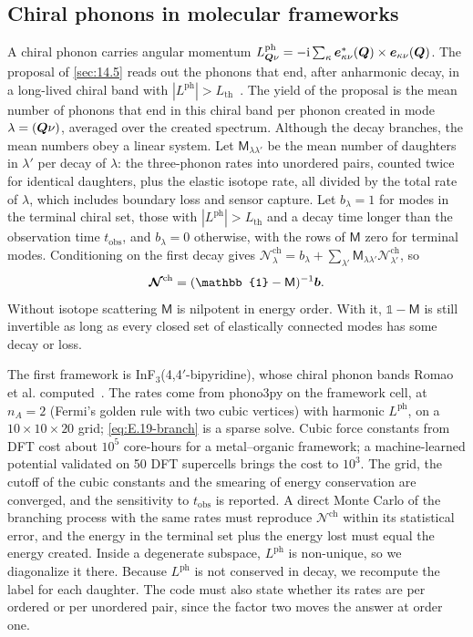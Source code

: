 \subsection{Chiral phonons in molecular frameworks}

A chiral phonon carries angular momentum $L^{\mathrm{ph}}_{\bm{Q}\nu} = -\mathrm{i}\sum_\kappa\bm{e}^*_{\kappa\nu}(\bm{Q})\times\bm{e}_{\kappa\nu}(\bm{Q})$. The proposal of \cref{sec:14.5} reads out the phonons that end, after anharmonic decay, in a long-lived chiral band with $|L^{\mathrm{ph}}| > L_{\mathrm{th}}$~\cite{romao2023chiral}. The yield of the proposal is the mean number of phonons that end in this chiral band per phonon created in mode $\lambda = (\bm{Q}\nu)$, averaged over the created spectrum. Although the decay branches, the mean numbers obey a linear system. Let $\mathsf{M}_{\lambda\lambda'}$ be the mean number of daughters in $\lambda'$ per decay of $\lambda$: the three-phonon rates into unordered pairs, counted twice for identical daughters, plus the elastic isotope rate, all divided by the total rate of $\lambda$, which includes boundary loss and sensor capture. Let $b_\lambda = 1$ for modes in the terminal chiral set, those with $|L^{\mathrm{ph}}| > L_{\mathrm{th}}$ and a decay time longer than the observation time $t_{\mathrm{obs}}$, and $b_\lambda = 0$ otherwise, with the rows of $\mathsf{M}$ zero for terminal modes. Conditioning on the first decay gives $\mathcal{N}^{\mathrm{ch}}_\lambda = b_\lambda + \sum_{\lambda'}\mathsf{M}_{\lambda\lambda'}\mathcal{N}^{\mathrm{ch}}_{\lambda'}$, so
\begin{equation}
  \boldsymbol{\mathcal{N}}^{\mathrm{ch}} = (\mathbb{1} - \mathsf{M})^{-1}\vect{b} .
  \label{eq:E.19-branch}
\end{equation}
Without isotope scattering $\mathsf{M}$ is nilpotent in energy order. With it, $\mathbb{1} - \mathsf{M}$ is still invertible as long as every closed set of elastically connected modes has some decay or loss.

The first framework is InF$_3$(4,4$'$-bipyridine), whose chiral phonon bands Romao et al. computed~\cite{romao2023chiral}. The rates come from phono3py on the framework cell, at $n_A = 2$ (Fermi's golden rule with two cubic vertices) with harmonic $L^{\mathrm{ph}}$, on a $10\times10\times20$ grid; \cref{eq:E.19-branch} is a sparse solve. Cubic force constants from DFT cost about $10^5$ core-hours for a metal--organic framework; a machine-learned potential validated on 50 DFT supercells brings the cost to $10^3$. The grid, the cutoff of the cubic constants and the smearing of energy conservation are converged, and the sensitivity to $t_{\mathrm{obs}}$ is reported. A direct Monte Carlo of the branching process with the same rates must reproduce $\boldsymbol{\mathcal{N}}^{\mathrm{ch}}$ within its statistical error, and the energy in the terminal set plus the energy lost must equal the energy created. Inside a degenerate subspace, $L^{\mathrm{ph}}$ is non-unique, so we diagonalize it there. Because $L^{\mathrm{ph}}$ is not conserved in decay, we recompute the label for each daughter. The code must also state whether its rates are per ordered or per unordered pair, since the factor two moves the answer at order one.

